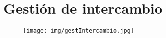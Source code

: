 \pagebreak
\section{Gestión de intercambio}
\begin{figure}[!h]
  \centering
    \texttt{[image: img/gestIntercambio.jpg]}
    \caption{}
\end{figure}